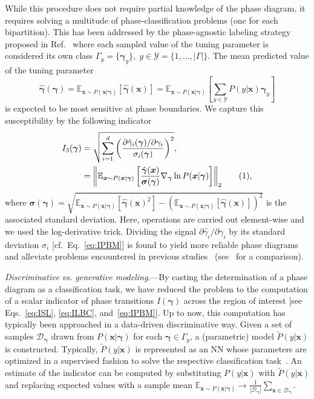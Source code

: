 \documentclass[twocolumn,aps,prl,superscriptaddress,tightlines,nofootinbib]{revtex4-2}
\newcommand\numberthis{\addtocounter{equation}{1}\tag{\theequation}}
\begin{document}
\indent While this procedure does not require partial knowledge of the phase diagram, it requires solving a multitude of phase-classification problems (one for each bipartition). This has been addressed by the phase-agnostic labeling strategy proposed in Ref.~\cite{schaefer:2019} where each sampled value of the tuning parameter is considered its own class $\Gamma_{y} = \{ \bm{\gamma}_{y}\}, \; y \in \mathcal{Y} = \{1,\dots,|\Gamma| \}$. The mean predicted value of the tuning parameter
\begin{equation}
    \hat{\bm{\gamma}}(\bm{\gamma}) = \mathbb{E}_{\bm{x} \sim P(\bm{x}|\bm{\gamma})}\left[ \hat{\bm{\gamma}}(\bm{x})\right] = \mathbb{E}_{\bm{x} \sim P(\bm{x}|\bm{\gamma})}\left[ \sum_{y \in \mathcal{Y}} P(y|\bm{x})\bm{\gamma}_{y}\right]
\end{equation}
is expected to be most sensitive at phase boundaries. We capture this susceptibility by the following indicator
\begin{align*}\label{eq:IPBM}
    I_{3}(\bm{\gamma}) &= \sqrt{\sum_{i=1}^{d} \left(\frac{\partial \hat{\gamma}_{i}(\bm{\gamma}) / \partial \gamma_{i} }{\sigma_{i}(\bm{\gamma})}\right)^2},\\
    &=  \norm{ \mathbb{E}_{\bm{x} \sim P(\bm{x}|\bm{\gamma})}\left[\frac{\hat{\bm{\gamma}}(\bm{x})}{\bm{\sigma}(\bm{\gamma})} \nabla_{\bm{\gamma}} \ln P(\bm{x}|\bm{\gamma}) \right]}_{2} \numberthis,
\end{align*}
where $\bm{\sigma}(\bm{\gamma}) = \sqrt{\mathbb{E}_{\bm{x} \sim P(\bm{x}|\bm{\gamma})}\left[ \hat{\bm{\gamma}}(\bm{x})^2\right] - \left(\mathbb{E}_{\bm{x} \sim P(\bm{x}|\bm{\gamma})}\left[ \hat{\bm{\gamma}}(\bm{x})\right]\right)^2}$ is the associated standard deviation. Here, operations are carried out element-wise and we used the log-derivative trick. Dividing the signal $\partial \hat{\gamma}_{i}/\partial \gamma_{i}$ by its standard deviation $\sigma_{i}$ [cf.~Eq.~\eqref{eq:IPBM}] is found to yield more reliable phase diagrams and alleviate problems encountered in previous studies~\cite{schaefer:2019,arnold:2022} (see~\cite{suppl} for a comparison).

\indent \emph{Discriminative vs. generative modeling}.---By casting the determination of a phase diagram as a classification task, we have reduced the problem to the computation of a scalar indicator of phase transitions $I(\bm{\gamma})$ across the region of interest [see Eqs.~\eqref{eq:ISL}, \eqref{eq:ILBC}, and~\eqref{eq:IPBM}]. Up to now, this computation has typically been approached in a data-driven discriminative way. Given a set of samples $\mathcal{D}_{\bm{\gamma}}$ drawn from $P(\bm{x}|\bm{\gamma})$ for each $\bm{\gamma} \in \Gamma_{y}$, a (parametric) model $\tilde{P}(y|\bm{x})$ is constructed. Typically, $\tilde{P}(y|\bm{x})$ is represented as an NN whose parameters are optimized in a supervised fashion to solve the respective classification task~\cite{suppl}. An estimate of the indicator can be computed by substituting $P(y|\bm{x})$ with $\tilde{P}(y|\bm{x})$ and replacing expected values with a sample mean $\mathbb{E}_{\bm{x} \sim P(\bm{x}|\bm{\gamma})} \rightarrow \frac{1}{|\mathcal{D}_{\bm{\gamma}}|}\sum_{\bm{x} \in \mathcal{D}_{\bm{\gamma}}}$.
\end{document}
